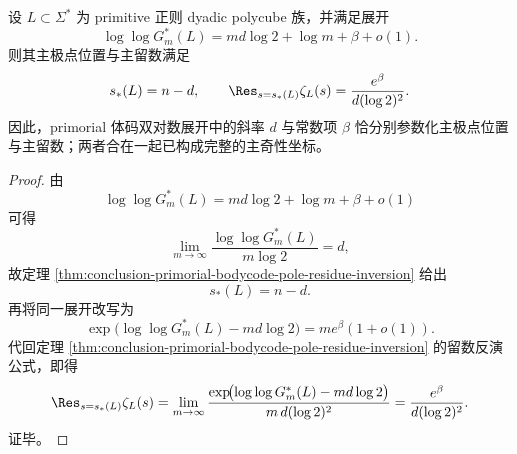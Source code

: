 \begin{corollary}\label{cor:conclusion-primorial-bodycode-doublelog-beta-parametrization}
设 \(L\subset \Sigma^\ast\) 为 primitive 正则 dyadic polycube 族，并满足展开
\[
\log\log G_m^\ast(L)=m d\log 2+\log m+\beta+o(1).
\]
则其主极点位置与主留数满足
\[
s_\ast(L)=n-d,
\qquad
\Res_{s=s_\ast(L)}\zeta_L(s)=\frac{e^\beta}{d(\log 2)^2}.
\]
因此，primorial 体码双对数展开中的斜率 \(d\) 与常数项 \(\beta\) 恰分别参数化主极点位置与主留数；两者合在一起已构成完整的主奇性坐标。
\end{corollary}
\begin{proof}
由
\[
\log\log G_m^\ast(L)=m d\log 2+\log m+\beta+o(1)
\]
可得
\[
\lim_{m\to\infty}\frac{\log\log G_m^\ast(L)}{m\log 2}=d,
\]
故定理 \ref{thm:conclusion-primorial-bodycode-pole-residue-inversion} 给出
\[
s_\ast(L)=n-d.
\]
再将同一展开改写为
\[
\exp\!\bigl(\log\log G_m^\ast(L)-m d\log 2\bigr)
=
m e^\beta(1+o(1)).
\]
代回定理 \ref{thm:conclusion-primorial-bodycode-pole-residue-inversion} 的留数反演公式，即得
\[
\Res_{s=s_\ast(L)}\zeta_L(s)
=
\lim_{m\to\infty}
\frac{
\exp\!\bigl(\log\log G_m^\ast(L)-m d\log 2\bigr)
}
{m\,d(\log 2)^2}
=
\frac{e^\beta}{d(\log 2)^2}.
\]
证毕。
\end{proof}
